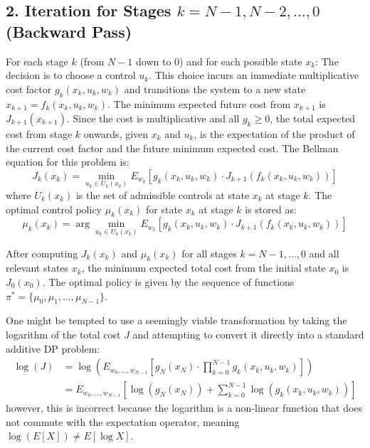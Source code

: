 \documentclass[11pt, a4paper, oneside]{memoir}
\begin{document}
\subsection*{2. Iteration for Stages $k = N-1, N-2, \dots, 0$ (Backward Pass)}
For each stage $k$ (from $N-1$ down to $0$) and for each possible state $x_k$:
The decision is to choose a control $u_k$. This choice incurs an immediate multiplicative cost factor $g_k(x_k, u_k, w_k)$ and transitions the system to a new state $x_{k+1} = f_k(x_k, u_k, w_k)$. The minimum expected future cost from $x_{k+1}$ is $J_{k+1}(x_{k+1})$.
Since the cost is multiplicative and all $g_k \ge 0$, the total expected cost from stage $k$ onwards, given $x_k$ and $u_k$, is the expectation of the product of the current cost factor and the future minimum expected cost.
The Bellman equation for this problem is:
\[
J_k(x_k) = \min_{u_k \in U_k(x_k)} E_{w_k}[g_k(x_k, u_k, w_k) \cdot J_{k+1}(f_k(x_k, u_k, w_k))]
\]
where $U_k(x_k)$ is the set of admissible controls at state $x_k$ at stage $k$.
The optimal control policy $\mu_k(x_k)$ for state $x_k$ at stage $k$ is stored as:
\[
\mu_k(x_k) = \arg\min_{u_k \in U_k(x_k)} E_{w_k}[g_k(x_k, u_k, w_k) \cdot J_{k+1}(f_k(x_k, u_k, w_k))]
\]

After computing $J_k(x_k)$ and $\mu_k(x_k)$ for all stages $k=N-1, \dots, 0$ and all relevant states $x_k$,
the minimum expected total cost from the initial state $x_0$ is $J_0(x_0)$.
The optimal policy is given by the sequence of functions $\pi^* = \{\mu_0, \mu_1, \dots, \mu_{N-1}\}$.

One might be tempted to use a seemingly viable transformation by taking the logarithm of the total cost $J$
and attempting to convert it directly into a standard additive DP problem:
\begin{align*}
\log(J) &= \log \left( E_{w_0, \dots, w_{N-1}}\left[g_N(x_N) \cdot \prod_{k=0}^{N-1} g_k(x_k, u_k, w_k)\right] \right) \\
&= E_{w_0, \dots, w_{N-1}}\left[\log(g_N(x_N)) + \sum_{k=0}^{N-1} \log(g_k(x_k, u_k, w_k))\right]
\end{align*}
however, this is incorrect because the logarithm is a non-linear function that does not commute with the expectation operator, meaning $\log(E[X]) \neq E[\log X]$.
\end{document}
